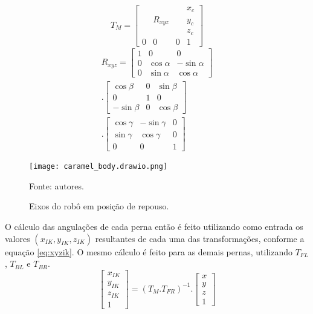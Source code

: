 \documentclass[../main.tex]{subfiles}
\begin{document}
\begin{equation}
  \label{eq:Tm}
  T_M =
  \begin{bmatrix}
      &         &   & x_c \\
      & R_{xyz} &   & y_c \\
      &         &   & z_c \\
    0 & 0       & 0 & 1
  \end{bmatrix}
\end{equation}
\begin{equation}
  \label{eq:Rxyz}
  \begin{split}
    R_{xyz} =
    \begin{bmatrix}
      1 & 0          & 0           \\
      0 & \cos\alpha & -\sin\alpha \\
      0 & \sin\alpha & \cos\alpha
    \end{bmatrix}
    \\.
    \begin{bmatrix}
      \cos\beta  & 0 & \sin\beta \\
      0          & 1 & 0         \\
      -\sin\beta & 0 & \cos\beta
    \end{bmatrix}
    \\.
    \begin{bmatrix}
      \cos\gamma & -\sin\gamma & 0 \\
      \sin\gamma & \cos\gamma  & 0 \\
      0          & 0           & 1
    \end{bmatrix}
  \end{split}
\end{equation}

\begin{figure}[!htb]
  \centering
  \caption{Eixos do robô em posição de repouso.}
  \vspace{-0.75cm}
  \texttt{[image: caramel\_body.drawio.png]}
  
  Fonte: autores.
  \label{fig:caramel_body}
\end{figure}

O cálculo das angulações de cada perna então é feito utilizando como entrada os valores $(x_{IK}, y_{IK}, z_{IK})$ resultantes de cada uma das transformações, conforme a equação \ref{eq:xyzik}. O mesmo cálculo é feito para as demais pernas, utilizando  $T_{FL}$, $T_{BL}$ e $T_{BR}$.
\begin{equation}
  \label{eq:xyzik}
  \begin{bmatrix}
    x_{IK} \\
    y_{IK} \\
    z_{IK} \\
    1
  \end{bmatrix}= (T_M.T_{FR})^{-1}.
  \begin{bmatrix}
    x \\
    y \\
    z \\
    1
  \end{bmatrix}
\end{equation}
\end{document}
